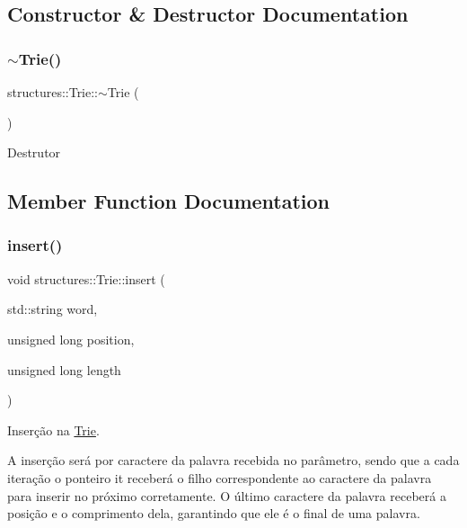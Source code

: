 \subsection{Constructor \& Destructor Documentation}
\mbox{\label{classstructures_1_1Trie_a02b9941c124c9c6ab85eff56bef7cf77}} 
\subsubsection{\texorpdfstring{$\sim$\+Trie()}{~Trie()}}
{\footnotesize\ttfamily structures\+::\+Trie\+::$\sim$\+Trie (\begin{DoxyParamCaption}{ }\end{DoxyParamCaption})\hspace{0.3cm}{\ttfamily [default]}}

Destrutor 

\subsection{Member Function Documentation}
\mbox{\label{classstructures_1_1Trie_a70ff5a7364c0bb15028578596514cea4}} 
\subsubsection{\texorpdfstring{insert()}{insert()}}
{\footnotesize\ttfamily void structures\+::\+Trie\+::insert (\begin{DoxyParamCaption}\item[{std\+::string}]{word,  }\item[{unsigned long}]{position,  }\item[{unsigned long}]{length }\end{DoxyParamCaption})\hspace{0.3cm}{\ttfamily [inline]}}



Inserção na \hyperlink{classstructures_1_1Trie}{Trie}. 

A inserção será por caractere da palavra recebida no parâmetro, sendo que a cada iteração o ponteiro it receberá o filho correspondente ao caractere da palavra para inserir no próximo corretamente. O último caractere da palavra receberá a posição e o comprimento dela, garantindo que ele é o final de uma palavra.


